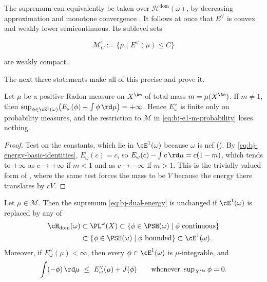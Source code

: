 The supremum can equivalently be taken over
$\mathcal H^{\mathrm{dom}}(\omega)$, by
decreasing approximation and monotone convergence
\cite[Proposition~9.4]{BJ22}.  It follows at once that $E^\vee$ is convex
and weakly lower semicontinuous.  Its sublevel sets

\[
             \mathcal M^1_C:=\{\mu\mid E^\vee(\mu)\leq C\}
\tag{47.13}\label{eq:bj-measure-energy-sublevel}
\]

are weakly compact.

The next three statements make all of this precise and prove it.

\begin{lemma}
\label{lem:ch47-mass-forced}
Let $\mu$ be a positive Radon measure on $X^{\An}$ of total mass
$m=\mu(X^{\An})$.  If $m\ne1$, then
$\sup_{\phi\in\cE^1(\omega)}\bigl(E_\omega(\phi)-\int\phi\,\rd\mu\bigr)
=+\infty$.  Hence $E^\vee_\omega$ is finite only on probability
measures, and the restriction to $\mathcal M$ in
\eqref{eq:bj-e1-m-probability} loses nothing.
\end{lemma}

\begin{proof}
Test on the constants, which lie in $\cE^1(\omega)$ because $\omega$ is
nef ().  By
\eqref{eq:bj-energy-basic-identities}, $E_\omega(c)=c$, so
$E_\omega(c)-\int c\,\rd\mu=c(1-m)$, which tends to $+\infty$ as
$c\to+\infty$ if $m<1$ and as $c\to-\infty$ if $m>1$.  This is the
trivially valued form of , where the same test
forces the mass to be $V$ because the energy there translates by $cV$.
\end{proof}

\begin{proposition}
\label{prop:ch47-test-class}
Let $\mu\in\mathcal M$.  Then the supremum
\eqref{eq:bj-dual-energy} is unchanged if $\cE^1(\omega)$ is replaced by
any of
\[
 \begin{aligned}
 \cH_{\mathrm{dom}}(\omega)
 &\subset \PL^\omega(X)
 \subset \{\phi\in\PSH(\omega)\mid \phi\ \text{continuous}\}\\
 &\subset \{\phi\in\PSH(\omega)\mid \phi\ \text{bounded}\}
 \subset \cE^1(\omega).
 \end{aligned}
\]
Moreover, if $E^\vee_\omega(\mu)<\infty$, then every
$\phi\in\cE^1(\omega)$ is $\mu$-integrable, and
\[
 \int(-\phi)\,\rd\mu\ \le\ E^\vee_\omega(\mu)+J(\phi)
 \qquad\text{whenever }\sup\nolimits_{X^{\An}}\phi=0 .
\]
\end{proposition}

